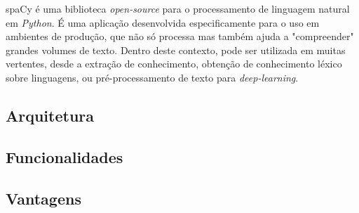 \documentclass[12pt]{article}
\begin{document}
spaCy é uma biblioteca \textit{open-source} para o processamento de linguagem natural em \textit{Python}. É uma aplicação desenvolvida especificamente para o uso em ambientes
de produção, que não só processa mas também ajuda a "compreender" grandes volumes de texto. Dentro deste contexto, pode ser utilizada em muitas vertentes, desde a extração de
conhecimento, obtenção de conhecimento léxico sobre linguagens, ou pré-processamento de texto para \textit{deep-learning}.


\subsection{Arquitetura}


\subsection{Funcionalidades}






\subsection{Vantagens}

\end{document}
